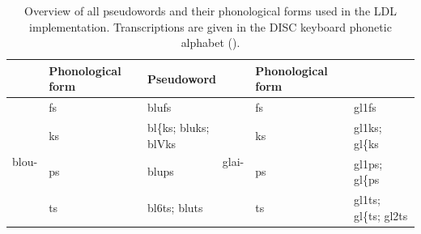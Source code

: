 \begin{table}\fontsize{9}{10}
\caption{Overview of all pseudowords and their phonological forms used in the LDL implementation. Transcriptions are given in the DISC keyboard phonetic alphabet (\cite{Burnage1988}).}
\label{tab:5.1}
\centering
\begin{tabular}{llllll} 
\lsptoprule
\multicolumn{2}{l}{Pseudoword}                                                          & Phonological form                                                                                     & \multicolumn{2}{l}{Pseudoword}                                                        & Phonological form                                                                                     \\ 
\midrule%
\multirow{4}{*}{blou-} & fs                                                             & blufs                                                                                                 & \multirow{4}{*}{glai-} & fs                                                           & gl1fs                                                                                                 \\
                       & ks                                                             & bl\{ks;
  bluks; blVks                                                                                &                        & ks                                                           & gl1ks;
  gl\{ks                                                                                       \\
                       & ps                                                             & blups                                                                                                 &                        & ps                                                           & gl1ps;
  gl\{ps                                                                                       \\
                       & ts                                                             & bl6ts;
  bluts                                                                                        &                        & ts                                                           & gl1ts;
  gl\{ts; gl2ts                                                                                \\ 
\midrule%

\end{tabular}
\end{table}
